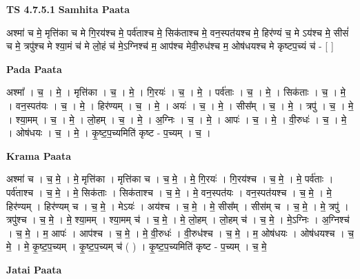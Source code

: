 \documentclass[17pt]{extarticle}
\begin{document}
\textbf{TS 4.7.5.1 } \newline
\textbf{Samhita Paata} \newline

अश्मा॑ च मे॒ मृत्ति॑का च मे गि॒रय॑श्च मे॒ पर्व॑ताश्च मे॒ सिक॑ताश्च मे॒     वन॒स्पत॑यश्च मे॒ हिर॑ण्यं च॒ मे ऽय॑श्च मे॒ सीसं॑ च मे॒ त्रपु॑श्च मे    श्या॒मं च॑ मे लो॒हं च॑ मे॒ऽग्निश्च॑ म॒ आप॑श्च मेवी॒रुध॑श्च म॒ ओष॑धयश्च मे कृष्टप॒च्यं च॑ - [  ] \newline

\textbf{Pada Paata} \newline

अश्मा᳚ । च॒ । मे॒ । मृत्ति॑का । च॒ । मे॒ । गि॒रयः॑ । च॒ । मे॒ । पर्व॑ताः । च॒ । मे॒ । सिक॑ताः । च॒ । मे॒ । वन॒स्पत॑यः । च॒ । मे॒ । हिर॑ण्यम् । च॒ । मे॒ । अयः॑ । च॒ । मे॒ । सीस᳚म् । च॒ । मे॒ । त्रपु॑ । च॒ । मे॒ । श्या॒मम् । च॒ । मे॒ । लो॒हम् । च॒ । मे॒ । अ॒ग्निः । च॒ । मे॒ । आपः॑ । च॒ । मे॒ । वी॒रुधः॑ । च॒ । मे॒ । ओष॑धयः । च॒ । मे॒ । कृ॒ष्ट॒प॒च्यमिति॑ कृष्ट - प॒च्यम् । च॒ ।  \newline


\textbf{Krama Paata} \newline

अश्मा॑ च । च॒ मे॒ । मे॒ मृत्ति॑का । मृत्ति॑का च । च॒ मे॒ । मे॒॒ गि॒रयः॑ । गि॒रय॑श्च । च॒ मे॒ । मे॒ पर्व॑ताः । पर्व॑ताश्च । च॒ मे॒ । मे॒ सिक॑ताः । सिक॑ताश्च । च॒ मे॒ । मे॒ वन॒स्पत॑यः । वन॒स्पत॑यश्च । च॒ मे॒ । मे॒ हिर॑ण्यम् । हिर॑ण्यम् च । च॒ मे॒ । मेऽयः॑ । अय॑श्च । च॒ मे॒ । मे॒ सीस᳚म् । सीस॑म् च । च॒ मे॒ । मे॒ त्रपु॑ । त्रपु॑श्च । च॒ मे॒ । मे॒ श्या॒मम् । श्या॒मम् च॑ । च॒ मे॒ । मे॒ लो॒हम् । लो॒हम् च॑ । च॒ मे॒ । मे॒ऽग्निः । अ॒ग्निश्च॑ । च॒ मे॒ । म॒ आपः॑ । आप॑श्च । च॒ मे॒ । मे॒ वी॒रुधः॑ । वी॒रुध॑श्च । च॒ मे॒ । म॒ ओष॑धयः । ओष॑धयश्च । च॒ मे॒ । मे॒ कृ॒ष्ट॒प॒च्यम् । कृ॒ष्ट॒प॒च्यम् च॑ ( ) । कृ॒ष्ट॒प॒च्यमिति॑ कृष्ट - प॒च्यम् । च॒ मे॒ \newline

\textbf{Jatai Paata} \newline
\end{document}
